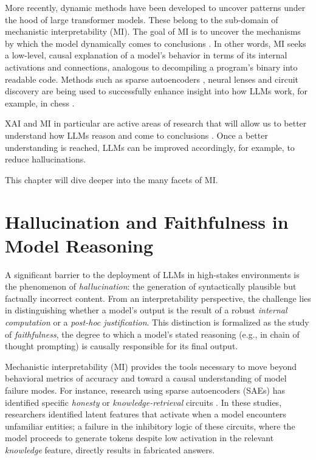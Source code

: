 More recently, dynamic methods have been developed to uncover patterns under the hood of large transformer models. These belong to the sub-domain of mechanistic interpretability (MI). The goal of MI is to uncover the mechanisms by which the model dynamically comes to conclusions \citep{nanda2023progress,bereska2024mechanistic,ferrando2024primer,rai2024practical}. 
In other words, MI seeks a low-level, causal explanation of a model's behavior in terms of its internal activations and connections, analogous to decompiling a program's binary into readable code.
Methods such as sparse autoencoders \citep{cunningham2023sparse,makelov2024towards}, neural lenses \citep{black2022interpreting} and circuit discovery \citep{conmy2023towards} are being used to successfully enhance insight into how LLMs work, for example, in chess \citep{davis2024decoding}.

XAI and MI in particular are active areas of research that will allow us to better understand how LLMs reason and come to conclusions \citep{sharkey2025open}. Once a better understanding is reached, LLMs can be improved accordingly, for example, to reduce hallucinations.

This chapter will dive deeper into the many facets of MI.

\section{Hallucination and Faithfulness in Model Reasoning}

A significant barrier to the deployment of LLMs in high-stakes environments is the phenomenon of \emph{hallucination}: the generation of syntactically plausible but factually incorrect content. From an interpretability perspective, the challenge lies in distinguishing whether a model's output is the result of a robust \emph{internal computation} or a \emph{post-hoc justification}. This distinction is formalized as the study of \emph{faithfulness}, the degree to which a model's stated reasoning (e.g., in chain of thought prompting) is causally responsible for its final output.

Mechanistic interpretability (MI) provides the tools necessary to move beyond behavioral metrics of accuracy and toward a causal understanding of model failure modes. For instance, research using sparse autoencoders (SAEs) has identified specific \emph{honesty} or \emph{knowledge-retrieval} circuits \citep{lindsey2025biology}. In these studies, researchers identified latent features that activate when a model encounters unfamiliar entities; a failure in the inhibitory logic of these circuits, where the model proceeds to generate tokens despite low activation in the relevant \emph{knowledge} feature, directly results in fabricated answers.

